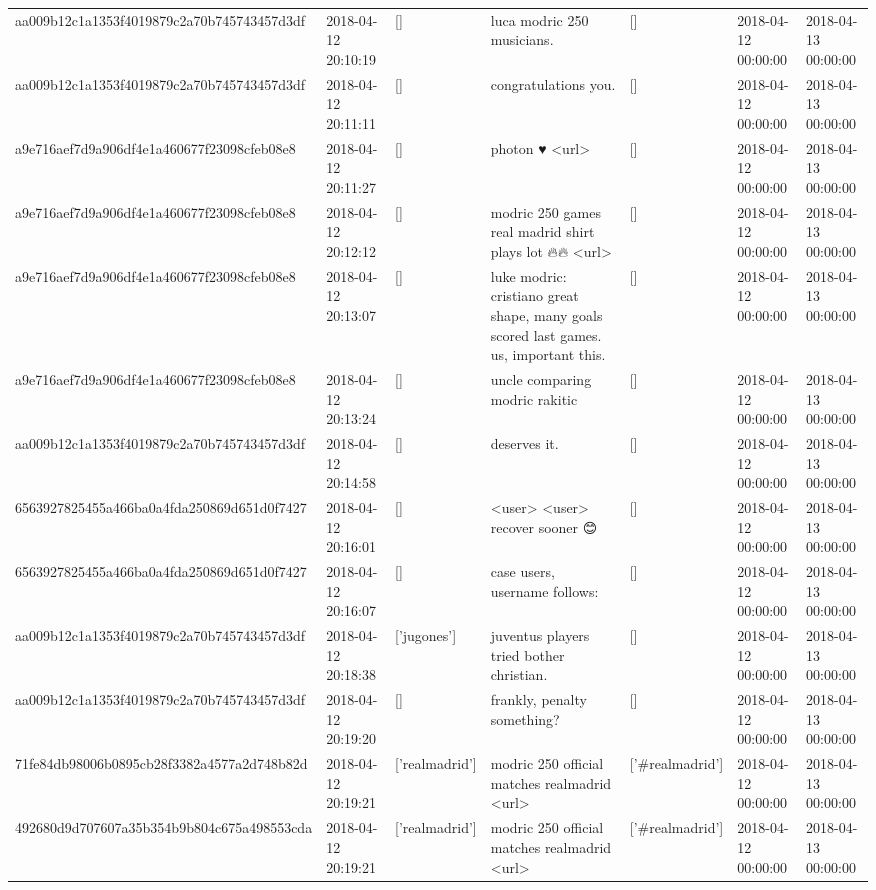 \begin{tabular}{lllllll}
aa009b12c1a1353f4019879c2a70b745743457d3df & 2018-04-12 20:10:19 & [] & luca modric 250 musicians. & [] & 2018-04-12 00:00:00 & 2018-04-13 00:00:00 \\
aa009b12c1a1353f4019879c2a70b745743457d3df & 2018-04-12 20:11:11 & [] & congratulations you. & [] & 2018-04-12 00:00:00 & 2018-04-13 00:00:00 \\
a9e716aef7d9a906df4e1a460677f23098cfeb08e8 & 2018-04-12 20:11:27 & [] & photon ♥️ <url> & [] & 2018-04-12 00:00:00 & 2018-04-13 00:00:00 \\
a9e716aef7d9a906df4e1a460677f23098cfeb08e8 & 2018-04-12 20:12:12 & [] & modric 250 games real madrid shirt plays lot 🔥🔥 <url> & [] & 2018-04-12 00:00:00 & 2018-04-13 00:00:00 \\
a9e716aef7d9a906df4e1a460677f23098cfeb08e8 & 2018-04-12 20:13:07 & [] & luke modric: cristiano great shape, many goals scored last games. us, important this. & [] & 2018-04-12 00:00:00 & 2018-04-13 00:00:00 \\
a9e716aef7d9a906df4e1a460677f23098cfeb08e8 & 2018-04-12 20:13:24 & [] & uncle comparing modric rakitic & [] & 2018-04-12 00:00:00 & 2018-04-13 00:00:00 \\
aa009b12c1a1353f4019879c2a70b745743457d3df & 2018-04-12 20:14:58 & [] & deserves it. & [] & 2018-04-12 00:00:00 & 2018-04-13 00:00:00 \\
6563927825455a466ba0a4fda250869d651d0f7427 & 2018-04-12 20:16:01 & [] & <user> <user> recover sooner 😊 & [] & 2018-04-12 00:00:00 & 2018-04-13 00:00:00 \\
6563927825455a466ba0a4fda250869d651d0f7427 & 2018-04-12 20:16:07 & [] & case users, username follows: & [] & 2018-04-12 00:00:00 & 2018-04-13 00:00:00 \\
aa009b12c1a1353f4019879c2a70b745743457d3df & 2018-04-12 20:18:38 & ['jugones'] & juventus players tried bother christian. & [] & 2018-04-12 00:00:00 & 2018-04-13 00:00:00 \\
aa009b12c1a1353f4019879c2a70b745743457d3df & 2018-04-12 20:19:20 & [] & frankly, penalty something? & [] & 2018-04-12 00:00:00 & 2018-04-13 00:00:00 \\
71fe84db98006b0895cb28f3382a4577a2d748b82d & 2018-04-12 20:19:21 & ['realmadrid'] & modric 250 official matches realmadrid <url> & ['#realmadrid'] & 2018-04-12 00:00:00 & 2018-04-13 00:00:00 \\
492680d9d707607a35b354b9b804c675a498553cda & 2018-04-12 20:19:21 & ['realmadrid'] & modric 250 official matches realmadrid <url> & ['#realmadrid'] & 2018-04-12 00:00:00 & 2018-04-13 00:00:00 \\

\end{tabular}
